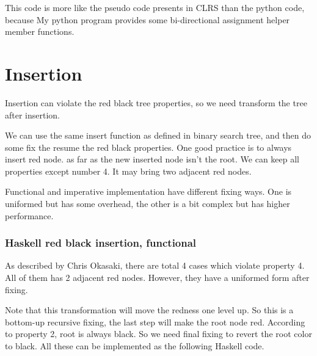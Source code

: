 \documentclass{article}
\begin{document}
This code is more like the pseudo code presents in CLRS than the
python code, because My python program provides some bi-directional
assignment helper member functions.

\section{Insertion}

Insertion can violate the red black tree properties, so we need transform
the tree after insertion.

We can use the same insert function as defined in binary search tree, and 
then do some fix the resume the red black properties. One good practice is 
to always insert red node. as far as the new inserted node isn't the root.
We can keep all properties except number 4. It may bring two adjacent red
nodes.

Functional and imperative implementation have different fixing ways. One
is uniformed but has some overhead, the other is a bit complex but has 
higher performance.

\subsubsection*{Haskell red black insertion, functional}
As described by Chris Okasaki, there are total 4 cases which violate property 4.
All of them has 2 adjacent red nodes. However, they have a uniformed form
after fixing\cite{okasaki}. 


Note that this transformation will move the redness one level up. So this is a bottom-up recursive fixing, the last step will make the root node red. According
to property 2, root is always black. So we need final fixing to revert the root
color to black. All these can be implemented as the following Haskell code.
\end{document}
